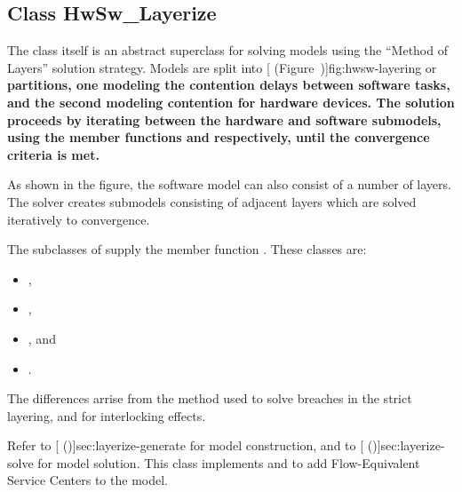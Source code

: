 \htmlrule
\subsection{Class HwSw\_Layerize}
\label{sec:hwsw}

The class  itself is an abstract superclass for
solving models using the ``Method of Layers'' solution strategy.
Models are split into [
(Figure~\Ref)]{fig:hwsw-layering} or \bf{partitions}, one modeling
the contention delays between software tasks, and the second modeling
contention for hardware devices.  The solution proceeds by iterating
between the hardware and software submodels, using the member
functions  and
 respectively,
until the convergence criteria is met.

\begin{figure}[p]
  \label{fig:hwsw-layering}
  \begin{center}
  \end{center}
\end{figure}

As shown in the figure, the software model can also consist of a
number of layers.  The solver creates submodels consisting of adjacent
layers which are solved iteratively to convergence.

The subclasses of  supply the member function
.  These classes are:
\begin{itemize}
\item {},
\item {},
\item {}, and
\item {}.
\end{itemize}
The differences arrise from the method used to solve breaches in the
strict layering, and for interlocking effects.

Refer to [ (\Sec\Ref)]{sec:layerize-generate}
for model construction, and to [
(\Sec\Ref)]{sec:layerize-solve} for model solution.  This class
implements  and  to add
Flow-Equivalent Service Centers to the model.

